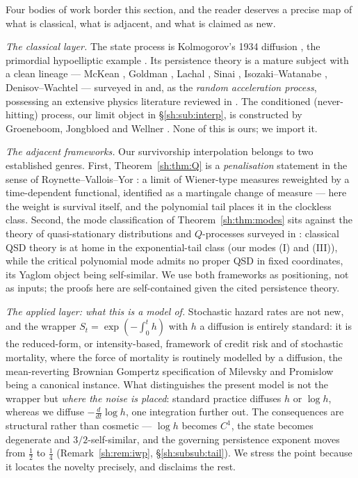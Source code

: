 \documentclass[11pt]{article}
\numberwithin{equation}{section}
\theoremstyle{plain}
\theoremstyle{definition}
\theoremstyle{remark}
\begin{document}
Four bodies of work border this section, and the reader deserves a
precise map of what is classical, what is adjacent, and what is claimed
as new.

\emph{The classical layer.} The state process is Kolmogorov's 1934
diffusion \cite{Kol34}, the primordial hypoelliptic example
\cite{Hor67}. Its persistence theory is a mature subject with a clean
lineage --- McKean \cite{McK63}, Goldman \cite{Gol71}, Lachal
\cite{Lac91}, Sinai \cite{Sin92}, Isozaki--Watanabe \cite{IW94},
Denisov--Wachtel \cite{DW15} --- surveyed in \cite{AS15} and, as the
\emph{random acceleration process}, possessing an extensive physics
literature reviewed in \cite{BMS13}. The conditioned (never-hitting)
process, our limit object in \S\ref{sh:sub:interp}, is constructed by
Groeneboom, Jongbloed and Wellner \cite{GJW99}. None of this is ours;
we import it.

\emph{The adjacent frameworks.} Our survivorship interpolation belongs
to two established genres. First, Theorem~\ref{sh:thm:Q} is a
\emph{penalisation} statement in the sense of Roynette--Vallois--Yor
\cite{RVY06}: a limit of Wiener-type measures reweighted by a
time-dependent functional, identified as a martingale change of measure
--- here the weight is survival itself, and the polynomial tail places
it in the clockless class. Second, the mode classification of
Theorem~\ref{sh:thm:modes} sits against the theory of quasi-stationary
distributions and $Q$-processes surveyed in \cite{MV12}: classical QSD
theory is at home in the exponential-tail class (our modes (I) and
(III)), while the critical polynomial mode admits no proper QSD in fixed
coordinates, its Yaglom object being self-similar. We use both
frameworks as positioning, not as inputs; the proofs here are
self-contained given the cited persistence theory.

\emph{The applied layer: what this is a model of.} Stochastic hazard
rates are not new, and the wrapper $S_t=\exp(-\int_0^th)$ with $h$ a
diffusion is entirely standard: it is the reduced-form, or
intensity-based, framework of credit risk \cite{Lan04} and of stochastic
mortality, where the force of mortality is routinely modelled by a
diffusion, the mean-reverting Brownian Gompertz specification of Milevsky
and Promislow \cite{MP01} being a canonical instance. What distinguishes
the present model is not the wrapper but \emph{where the noise is
placed}: standard practice diffuses $h$ or $\log h$, whereas we diffuse
$-\tfrac{d}{dt}\log h$, one integration further out. The consequences are
structural rather than cosmetic --- $\log h$ becomes $C^1$, the state
becomes degenerate and $3/2$-self-similar, and the governing persistence
exponent moves from $\tfrac12$ to $\tfrac14$ (Remark~\ref{sh:rem:iwp},
\S\ref{sh:subsub:tail}). We stress the point because it locates the
novelty precisely, and disclaims the rest.
\end{document}
